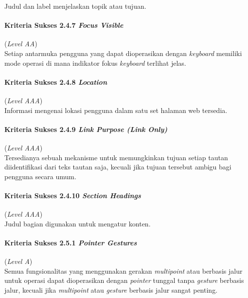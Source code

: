 Judul dan label menjelaskan topik atau tujuan.

\paragraph{Kriteria Sukses 2.4.7 \textit{Focus Visible}}
\label{subsec:kriteria_2.4.7}
(\textit{Level AA}) \\

Setiap antarmuka pengguna yang dapat dioperasikan dengan \textit{keyboard} memiliki mode operasi di mana indikator fokus \textit{keyboard} terlihat jelas.

\paragraph{Kriteria Sukses 2.4.8 \textit{Location}}
\label{subsec:kriteria_2.4.8}
(\textit{Level AAA}) \\

Informasi mengenai lokasi pengguna dalam satu set halaman web tersedia.

\paragraph{Kriteria Sukses 2.4.9 \textit{Link Purpose (Link Only)}}
\label{subsec:kriteria_2.4.9}
(\textit{Level AAA}) \\

Tersedianya sebuah mekanisme untuk memungkinkan tujuan setiap tautan diidentifikasi dari teks tautan saja, kecuali jika tujuan tersebut ambigu bagi pengguna secara umum.

\paragraph{Kriteria Sukses 2.4.10 \textit{Section Headings}}
\label{subsec:kriteria_2.4.10}
(\textit{Level AAA}) \\

Judul bagian digunakan untuk mengatur konten.

\paragraph{Kriteria Sukses 2.5.1 \textit{Pointer Gestures}}
\label{subsec:kriteria_2.5.1}
(\textit{Level A}) \\

Semua fungsionalitas yang menggunakan gerakan \textit{multipoint} atau berbasis jalur untuk operasi dapat dioperasikan dengan \textit{pointer} tunggal tanpa \textit{gesture} berbasis jalur, kecuali jika \textit{multipoint} atau \textit{gesture} berbasis jalur sangat penting.

